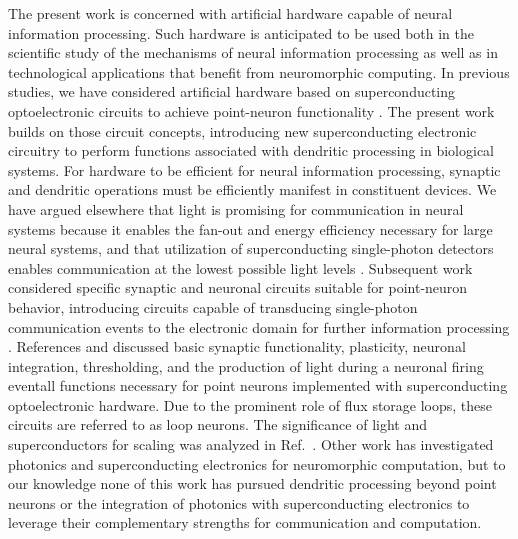 \documentclass[twocolumn]{article}
\newcommand{\onlinecite}[1]{\hspace{-1 ex} \nocite{#1}\citenum{#1}}
\begin{document}
The present work is concerned with artificial hardware capable of neural information processing. Such hardware is anticipated to be used both in the scientific study of the mechanisms of neural information processing as well as in technological applications that benefit from neuromorphic computing. In previous studies, we have considered artificial hardware based on superconducting optoelectronic circuits to achieve point-neuron functionality \cite{shbu2017,sh2018,sh2018_full}. The present work builds on those circuit concepts, introducing new superconducting electronic circuitry to perform functions associated with dendritic processing in biological systems. For hardware to be efficient for neural information processing, synaptic and dendritic operations must be efficiently manifest in constituent devices. We have argued elsewhere that light is promising for communication in neural systems because it enables the fan-out and energy efficiency necessary for large neural systems, and that utilization of superconducting single-photon detectors enables communication at the lowest possible light levels \cite{shbu2017}. Subsequent work considered specific synaptic and neuronal circuits suitable for point-neuron behavior, introducing circuits capable of transducing single-photon communication events to the electronic domain for further information processing \cite{sh2018,sh2018_full}. References \onlinecite{sh2018} and \onlinecite{sh2018_full} discussed basic synaptic functionality, plasticity, neuronal integration, thresholding, and the production of light during a neuronal firing event\textemdash all functions necessary for point neurons implemented with superconducting optoelectronic hardware. Due to the prominent role of flux storage loops, these circuits are referred to as loop neurons. The significance of light and superconductors for scaling was analyzed in Ref.\,\onlinecite{sh2018_ICRC}. Other work has investigated photonics \cite{nash2013,tafe2017,prsh2017,shha2016,chsa2018} and superconducting electronics \cite{hias2007,crsc2010,ru2016,sele2017,scdo2018,kafu2018} for neuromorphic computation, but to our knowledge none of this work has pursued dendritic processing beyond point neurons or the integration of photonics with superconducting electronics to leverage their complementary strengths for communication and computation. 
\end{document}

